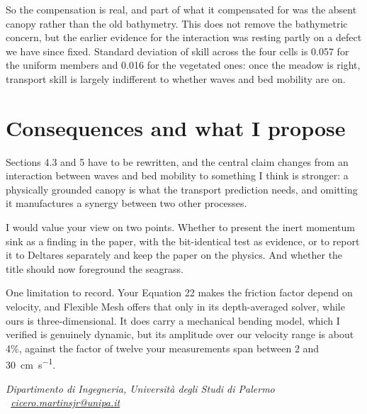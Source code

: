\documentclass[11pt]{article}
\begin{document}
So the compensation is real, and part of what it compensated for was the absent
canopy rather than the old bathymetry. This does not remove the bathymetric
concern, but the earlier evidence for the interaction was resting partly on a
defect we have since fixed. Standard deviation of skill across the four cells is
0.057 for the uniform members and 0.016 for the vegetated ones: once the meadow
is right, transport skill is largely indifferent to whether waves and bed
mobility are on.

\section{Consequences and what I propose}

Sections 4.3 and 5 have to be rewritten, and the central claim changes from an
interaction between waves and bed mobility to something I think is stronger: a
physically grounded canopy is what the transport prediction needs, and omitting
it manufactures a synergy between two other processes.

I would value your view on two points. Whether to present the inert momentum
sink as a finding in the paper, with the bit-identical test as evidence, or to
report it to Deltares separately and keep the paper on the physics. And whether
the title should now foreground the seagrass.

One limitation to record. Your Equation 22 makes the friction factor depend on
velocity, and Flexible Mesh offers that only in its depth-averaged solver, while
ours is three-dimensional. It does carry a mechanical bending model, which I
verified is genuinely dynamic, but its amplitude over our velocity range is
about 4\%, against the factor of twelve your measurements span between 2 and
\SI{30}{\centi\metre\per\second}.

\vspace{-0.2em}
{\footnotesize\itshape Dipartimento di Ingegneria, Universit\`a degli Studi di
Palermo \textperiodcentered\
\href{mailto:cicero.martinsjr@unipa.it}{cicero.martinsjr@unipa.it}}
\end{document}
